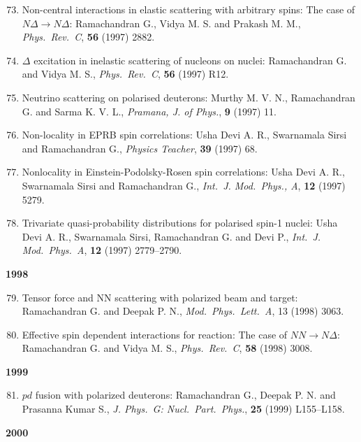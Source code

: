 \begin{enumerate}
\setcounter{enumi}{72}
\item Non-central interactions in elastic scattering with arbitrary spins: The case of $N\Delta\to N\Delta$: Ramachandran G., Vidya M. S. and Prakash M. M., \textit{Phys.\ Rev.\ C}, {\bf 56} (1997) 2882.
\item $\Delta$ excitation in inelastic scattering of nucleons on nuclei: Ramachandran G. and Vidya M. S., \textit{Phys.\ Rev.\ C}, {\bf 56} (1997) R12.
\item Neutrino scattering on polarised deuterons: Murthy M. V. N., Ramachandran G. and Sarma K. V. L., \textit{Pramana, J. of Phys.}, {\bf 9} (1997) 11.
\item Non-locality in EPRB spin correlations: Usha Devi A. R., Swarnamala Sirsi and Ramachandran G., \textit{Physics Teacher}, {\bf 39} (1997) 68.
\item Nonlocality in Einstein-Podolsky-Rosen spin correlations: Usha Devi A. R., Swarnamala Sirsi and Ramachandran G., \textit{Int.\ J. Mod.\ Phys., A}, {\bf 12} (1997) 5279.
\item Trivariate quasi-probability distributions for polarised spin-1 nuclei: Usha Devi A. R., Swarnamala Sirsi, Ramachandran G. and Devi P., \textit{Int.\ J. Mod.\ Phys.\ A}, {\bf 12} (1997) 2779--2790.
\end{enumerate}
\textbf{1998}
\begin{enumerate}
\setcounter{enumi}{78}
\item Tensor force and NN scattering with polarized beam and target: Ramachandran G. and Deepak P. N., \textit{Mod.\ Phys.\ Lett.\ A}, 13 (1998) 3063.
\item Effective spin dependent interactions for reaction: The case of $NN \to N\Delta$: Ramachandran G. and Vidya M. S., \textit{Phys.\ Rev.\ C}, {\bf 58} (1998) 3008.
\end{enumerate}
\textbf{1999}
\begin{enumerate}
\setcounter{enumi}{80}
\item $pd$ fusion with polarized deuterons: Ramachandran G., Deepak P. N. and Prasanna Kumar S., \textit{J. Phys.\ G: Nucl.\ Part.\ Phys.}, {\bf 25} (1999) L155--L158.
\end{enumerate}
\textbf{2000}

